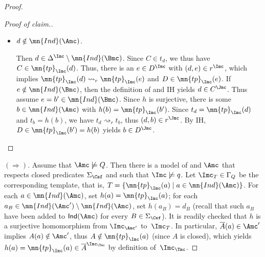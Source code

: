 \documentclass{lmcs}
\theoremstyle{definition}
\let\OriginalQedSymbol\qedsymbol
\renewcommand{\qedsymbol}{\OriginalQedSymbol\setcounter{claim}{0}}
\let\NormalQedSymbol\qedsymbol
\newenvironment{clmproof}[1]{\renewcommand{\qedsymbol}{$\dashv$}\begin{proof}[Proof of claim.]\space#1}{\end{proof}\renewcommand{\qedsymbol}{\NormalQedSymbol}}
\begin{document}
\begin{proof}
\begin{clmproof}
\begin{itemize}
  \item $d \notin \mn{Ind}(\Amc)$.

    Then $d \in \Delta^\Imc \setminus \mn{Ind}(\Bmc)$. Since $C \in
    t_d$, we thus have $C \in \mn{tp}_\Imc(d)$. Thus, there is an $e
    \in D^\Imc$ with $(d,e) \in r^\Imc$, which implies
    $\mn{tp}_\Imc(d) \rightsquigarrow_r \mn{tp}_\Imc(e)$ and $D \in
    \mn{tp}_\Imc(e)$.  If $e \notin \mn{Ind}(\Bmc)$, then the
    definition of \Jmc and IH yields $d \in C^\Jmc$. Thus assume $e=b'
    \in \mn{Ind}(\Bmc)$. Since $h$ is surjective, there is some $b \in
    \mn{Ind}(\Amc)$ with $h(b)=\mn{tp}_\Imc(b')$. Since
    $t_d=\mn{tp}_\Imc(d)$ and $t_b=h(b)$, we have $t_d
    \rightsquigarrow_r t_b$, thus $(d,b) \in r^\Jmc$. By IH, $D \in
    \mn{tp}_\Imc(b')=h(b)$ yields $b \in D^\Jmc$.
    
  \end{itemize}
  \end{clmproof}
  
  \noindent
  $(\Rightarrow)$.  Assume that $\Amc \not\models Q$. Then there is a 
  model \Imc of \Tmc and $\Amc$ that respects closed predicates 
  $\Sigma_{\Csf}$ and such that $\Imc\not\models q$.  Let $\Imc_T \in 
  \Gamma_{Q}$ be the corresponding template, that is, $ T = \{ 
  \mn{tp}_\Imc(a) \mid a \in \mn{Ind}(\Amc) \}$. For each $a \in 
  \mn{Ind}(\Amc)$, set $h(a)=\mn{tp}_\Imc(a)$; for each $a_B \in 
  \mn{Ind}(\Amc') \setminus \mn{Ind}(\Amc)$, set $h(a_B)=d_B$ (recall that such $a_{B}$ have
  been added to ${\sf Ind}(\Amc)$ for every $B\in \Sigma_{\Csf}$). It is 
  readily checked that $h$ is a surjective homomorphism from $\Imc_{\Amc'}$ 
  to~$\Imc_T$.  In particular, $\overline{A}(a) \in \Amc'$ implies 
  $A(a) \notin \Amc'$, thus $A \notin \mn{tp}_\Imc(a)$ (since $A$ is 
  closed), which yields $h(a)=\mn{tp}_\Imc(a) \in 
  \overline{A}^{\Imc_\Tmc}$ by definition of~$\Imc_\Tmc$.
\end{proof}
\end{document}
